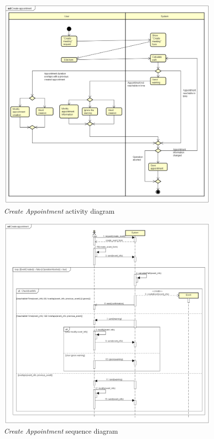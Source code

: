 \begin{figure}
	\includegraphics[width=\textwidth, height=\textheight, keepaspectratio=true]{Img/CreateAppointmentAC}
	\caption{\emph{Create Appointment} activity diagram}
	\label{fig:createappointmentac}
\end{figure}

\begin{figure}
	\includegraphics[width=\textwidth, height=\textheight, keepaspectratio=true]{Img/CreateAppointmentSQ}
	\caption{\emph{Create Appointment} sequence diagram}
	\label{fig:createappointmentsq}
\end{figure}

